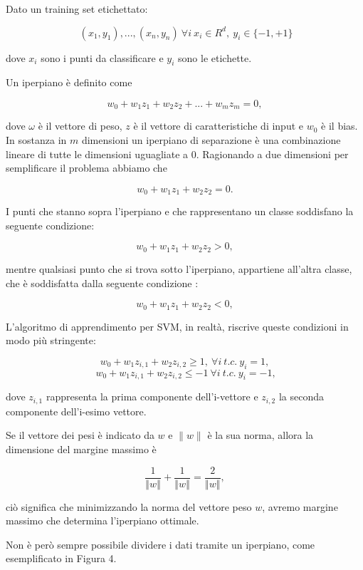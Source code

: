 \documentclass[12pt,italian]{report}
\begin{document}
Dato un training set etichettato:

\begin{center}
	\[
	\ (x_1, y_1), ..., (x_n, y_n)
	\ \forall i 
	\ x_i \in R^{d},
	\ y_i \in  \{ -1, +1 \}
	\]
\end{center}
dove $x_i$ sono i punti da classificare e $y_i$ sono le etichette.

Un iperpiano è definito come 
\begin{center}
	\[w_0 + w_1z_1 + w_2z_2 +...+ w_mz_m= 0,\]
\end{center}
dove $\omega$ è il vettore di peso, $z$ è il vettore di caratteristiche di input e $w_0$ è il bias.
In sostanza in $m$ dimensioni un iperpiano di separazione è una combinazione lineare di tutte le dimensioni uguagliate a 0.
Ragionando a due dimensioni per semplificare il problema abbiamo che 
\begin{center}
	\[w_0 + w_1z_1 + w_2z_2 = 0.\]
\end{center}
I punti che stanno sopra l'iperpiano e che rappresentano un classe soddisfano la seguente condizione:
\begin{center}
	\[w_0 + w_1z_1+w_2z_2 > 0,\]
\end{center}
mentre qualsiasi punto che si trova sotto l'iperpiano, appartiene all'altra classe, che è soddisfatta dalla seguente condizione :
\begin{center}
	\[w_0 + w_1z_1+w_2z_2 < 0,\]
\end{center}
L'algoritmo di apprendimento per SVM, in realtà, riscrive queste condizioni in modo più stringente:
\begin{center}
	\[w_0 + w_1z_{i,1}+w_2z_{i,2} \geq 1,
	\ \forall i 
	\ t.c. 
	\ y_i=1,\]
	\[
	\ w_0 + w_1z_{i,1}+w_2z_{i,2} \leq -1 
	\ \forall i 
	\ t.c.
	\ y_i = -1,\]
\end{center}
dove $z_{i,1}$ rappresenta la prima componente dell'i-vettore e $z_{i,2}$ la seconda componente dell'i-esimo vettore.

Se il vettore dei pesi è indicato da $w$ e $\parallel w \parallel$ è la sua norma, allora la dimensione del margine massimo è 
\begin{center}
	\[ \frac{1}{\left \Vert w \right \Vert} + \frac{1}{\left \Vert w \right \Vert} = \frac{2}{\left \Vert w \right \Vert},\]
\end{center}
ciò significa che minimizzando la norma del vettore peso $w$, avremo margine massimo che determina l'iperpiano ottimale.

Non è però sempre possibile dividere i dati tramite un iperpiano, come esemplificato in Figura 4.
\end{document}
